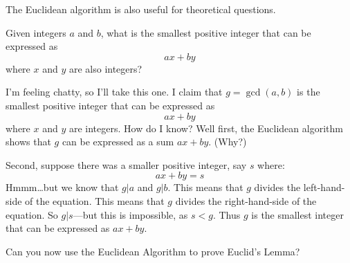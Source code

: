 The Euclidean algorithm is also useful for theoretical
questions.

\begin{question} 
Given integers $a$ and $b$, what is the smallest positive integer that
can be expressed as
\[
ax + by
\]
where $x$ and $y$ are also integers?
\end{question}


I'm feeling chatty, so I'll take this one. I claim that $g =
\gcd(a,b)$ is the smallest positive integer that can be
expressed as
\[
ax + by
\]
where $x$ and $y$ are integers. How do I know? Well first, the Euclidean algorithm shows that $g$ can be 
expressed as a sum $ax + by$.  (Why?)  

Second, suppose there was
a smaller positive integer, say $s$ where:
\[
ax + by = s
\]
Hmmm\dots but we know that $g|a$ and $g|b$. This means that $g$
divides the left-hand-side of the equation. This means that $g$
divides the right-hand-side of the equation. So $g|s$---but this is
impossible, as $s< g$. Thus $g$ is the smallest integer that can be
expressed as $ax +by$.


\begin{question} Can you now use the Euclidean Algorithm to prove Euclid's Lemma?
\end{question}
\QM



